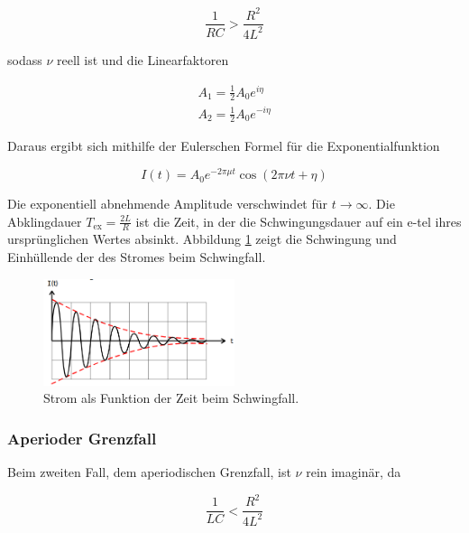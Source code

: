     \begin{equation*}
        \frac{1}{RC} > \frac{R^2}{4L^2}
    \end{equation*}
    
    sodass $\nu$ reell ist und die Linearfaktoren
    
    \begin{align*}
        A_1 = \frac{1}{2} A_0 e^{i \eta}\\
        A_2 = \frac{1}{2} A_0 e^{-i \eta}
    \end{align*}

    \noindent Daraus ergibt sich mithilfe der Eulerschen Formel für die Exponentialfunktion
    
    \begin{equation}
        I(t) = A_0 e^{-2 \pi \mu t}  \cos(2 \pi \nu t + \eta)
        \label{eqn:schwingfall}
    \end{equation}

    \noindent Die exponentiell abnehmende Amplitude verschwindet für $t \to \infty$.
    Die Abklingdauer $T_\text{ex} = \frac{2L}{R}$ ist die Zeit, in der die
    Schwingungsdauer auf ein e-tel ihres ursprünglichen Wertes absinkt.
    Abbildung \ref{fig:kurve} zeigt die Schwingung und Einhüllende der des Stromes
    beim Schwingfall.

    \begin{figure}
        \centering
        \includegraphics[width=0.5\textwidth]{kurve.png}
        \caption{Strom als Funktion der Zeit beim Schwingfall.\cite{anleitung}}
        \label{fig:kurve}
    \end{figure}

    \subsubsection{Aperioder Grenzfall}
    Beim zweiten Fall, dem aperiodischen Grenzfall, ist $\nu$ rein imaginär,
    da 

    \begin{equation*}
        \frac{1}{LC} < \frac{R^2}{4L^2}
    \end{equation*}

